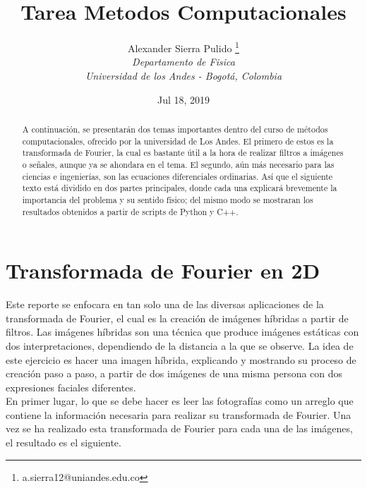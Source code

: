 \documentclass{article}
\title{Tarea Metodos Computacionales}
\author{Alexander Sierra Pulido \thanks {a.sierra12@uniandes.edu.co} \\\textit{{Departamento de Fisica}}\\\textit{{Universidad de los Andes - Bogotá, Colombia }}}
\date{Jul 18, 2019}
\begin{document}
\maketitle
\hrulefill
\begin{abstract}

A continuación, se presentarán dos temas importantes dentro del curso de métodos computacionales, ofrecido por la universidad de Los Andes. El primero de estos es la transformada de Fourier, la cual es bastante útil a la hora de realizar filtros a imágenes o señales, aunque ya se ahondara en el tema. El segundo, aún más necesario para las ciencias e ingenierías, son las ecuaciones diferenciales ordinarias. Así que el siguiente texto está dividido en dos partes principales, donde cada una explicará brevemente la importancia del problema y su sentido físico; del mismo modo se mostraran los resultados obtenidos a partir de scripts de Python y C++.      

\end{abstract}
\hrulefill

\section{Transformada de Fourier en 2D}
Este reporte se enfocara en tan solo una de las diversas aplicaciones de la transformada de Fourier, el cual es la creación de imágenes híbridas a partir de filtros. Las imágenes híbridas son una técnica que produce imágenes estáticas con dos interpretaciones, dependiendo de la distancia a la que se observe. La idea de este ejercicio es hacer una imagen híbrida, explicando y mostrando su proceso de creación paso a paso, a partir de dos imágenes de una misma persona con dos expresiones faciales diferentes.\\ 

En primer lugar, lo que se debe hacer es leer las fotografías como un arreglo que contiene la información necesaria para realizar su transformada de Fourier. Una vez se ha realizado esta transformada de Fourier para cada una de las imágenes, el resultado es el siguiente. 
\end{document}
